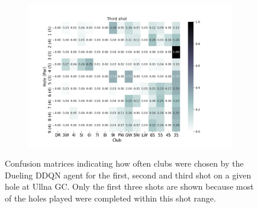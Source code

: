 \documentclass{kththesis}
\begin{document}
\begin{figure}
\begin{subfigure}{\textwidth}
    \includegraphics[height=0.3\textheight]{AgentClubChoices/DDDQN_Ullna_Club_Choices_Third_Shot.png} 
    \end{subfigure}
    \caption{Confusion matrices indicating how often clubs were chosen by the Dueling DDQN agent for the first, second and third shot on a given hole at Ullna GC. Only the first three shots are shown because most of the holes played were completed within this shot range.}
    \label{fig:DDDQN_ullna_club_choice_confusion}
\end{figure}
\end{document}
